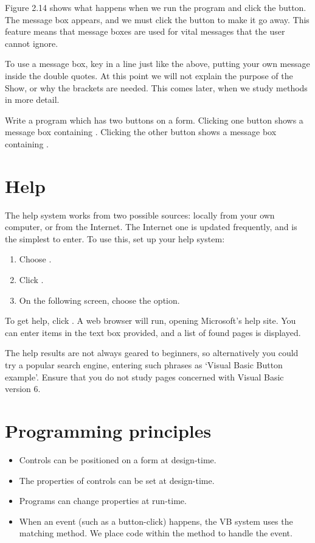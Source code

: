 		Figure 2.14 shows what happens when we run the program and click the button. The message box appears, and we must click the  button to make it go away. This feature means that message boxes are used for vital messages that the user cannot ignore.

		To use a message box, key in a line just like the above, putting your own message inside the double quotes. At this point we will not explain the purpose of the Show, or why the brackets are needed. This comes later, when we study methods in more detail.
	\begin{stqb}
			\begin{STQ}
			\item	Write a program which has two buttons on a form. Clicking one button shows a message box containing . Clicking the other button shows a message box containing .
			\end{STQ}
		\end{stqb}

		
	\section{Help}
		The help system works from two possible sources: locally from your own computer, or from the Internet. The Internet one is updated frequently, and is the simplest to enter. To use this, set up your help system:
		\begin{enumerate}
			\item	Choose .
			\item	Click .
			\item	On the following screen, choose the  option.
		\end{enumerate}
		To get help, click . A web browser will run, opening Microsoft’s help site. You can enter items in the text box provided, and a list of found pages is displayed.

		The help results are not always geared to beginners, so alternatively you could try a popular search engine, entering such phrases as ‘Visual Basic Button example’. Ensure that you do not study pages concerned with Visual Basic version 6.

	\section{Programming principles}
		\begin{itemize}
			\item Controls can be positioned on a form at design-time.
			\item The properties of controls can be set at design-time.
			\item Programs can change properties at run-time.
			\item When an event (such as a button-click) happens, the VB system uses the matching method. We place code within the method to handle the event.
		\end{itemize}

